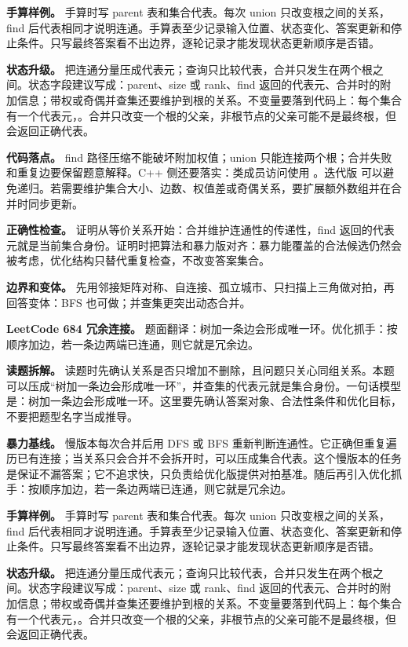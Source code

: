 \textbf{手算样例。} 手算时写 parent 表和集合代表。每次 union 只改变根之间的关系，find 后代表相同才说明连通。手算表至少记录输入位置、状态变化、答案更新和停止条件。只写最终答案看不出边界，逐轮记录才能发现状态更新顺序是否错。

\textbf{状态升级。} 把连通分量压成代表元；查询只比较代表，合并只发生在两个根之间。状态字段建议写成：parent、size 或 rank、find 返回的代表元、合并时的附加信息；带权或奇偶并查集还要维护到根的关系。不变量要落到代码上：每个集合有一个代表元，。合并只改变一个根的父亲，非根节点的父亲可能不是最终根，但  会返回正确代表。

\textbf{代码落点。} find 路径压缩不能破坏附加权值；union 只能连接两个根；合并失败和重复边要保留题意解释。C++ 侧还要落实：类成员访问使用 。迭代版  可以避免递归。若需要维护集合大小、边数、权值差或奇偶关系，要扩展额外数组并在合并时同步更新。

\textbf{正确性检查。} 证明从等价关系开始：合并维护连通性的传递性，find 返回的代表元就是当前集合身份。证明时把算法和暴力版对齐：暴力能覆盖的合法候选仍然会被考虑，优化结构只替代重复检查，不改变答案集合。

\textbf{边界和变体。} 先用邻接矩阵对称、自连接、孤立城市、只扫描上三角做对拍，再回答变体：BFS 也可做；并查集更突出动态合并。

\noindent\textbf{LeetCode 684 冗余连接。} 题面翻译：树加一条边会形成唯一环。优化抓手：按顺序加边，若一条边两端已连通，则它就是冗余边。

\textbf{读题拆解。} 读题时先确认关系是否只增加不删除，且问题只关心同组关系。本题可以压成“树加一条边会形成唯一环”，并查集的代表元就是集合身份。一句话模型是：树加一条边会形成唯一环。这里要先确认答案对象、合法性条件和优化目标，不要把题型名字当成推导。

\textbf{暴力基线。} 慢版本每次合并后用 DFS 或 BFS 重新判断连通性。它正确但重复遍历已有连接；当关系只会合并不会拆开时，可以压成集合代表。这个慢版本的任务是保证不漏答案；它不追求快，只负责给优化版提供对拍基准。随后再引入优化抓手：按顺序加边，若一条边两端已连通，则它就是冗余边。

\textbf{手算样例。} 手算时写 parent 表和集合代表。每次 union 只改变根之间的关系，find 后代表相同才说明连通。手算表至少记录输入位置、状态变化、答案更新和停止条件。只写最终答案看不出边界，逐轮记录才能发现状态更新顺序是否错。

\textbf{状态升级。} 把连通分量压成代表元；查询只比较代表，合并只发生在两个根之间。状态字段建议写成：parent、size 或 rank、find 返回的代表元、合并时的附加信息；带权或奇偶并查集还要维护到根的关系。不变量要落到代码上：每个集合有一个代表元，。合并只改变一个根的父亲，非根节点的父亲可能不是最终根，但  会返回正确代表。

